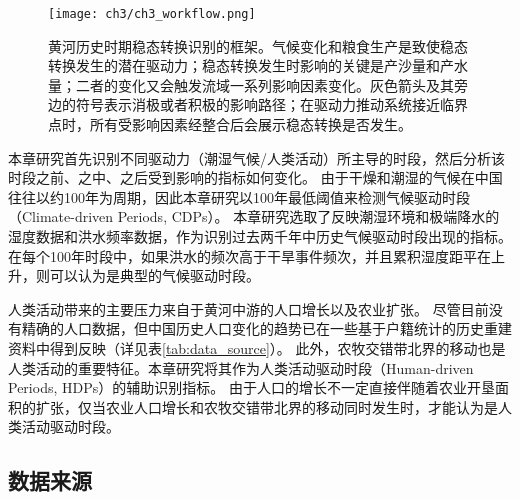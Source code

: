 \begin{figure}[htb] %
    \centering
    \texttt{[image: ch3/ch3\_workflow.png]}
    \caption[黄河历史时期水沙特征的稳态转换识别框架]{黄河历史时期稳态转换识别的框架。气候变化和粮食生产是致使稳态转换发生的潜在驱动力；稳态转换发生时影响的关键是产沙量和产水量；二者的变化又会触发流域一系列影响因素变化。灰色箭头及其旁边的符号表示消极或者积极的影响路径；在驱动力推动系统接近临界点时，所有受影响因素经整合后会展示稳态转换是否发生。}\label{fig:ch3:regime_shift_detect}
\end{figure}


本章研究首先识别不同驱动力（潮湿气候/人类活动）所主导的时段，然后分析该时段之前、之中、之后受到影响的指标如何变化。
由于干燥和潮湿的气候在中国往往以约100年为周期\cite{GeQuanSheng2011}，因此本章研究以100年最低阈值来检测气候驱动时段（Climate-driven Periods, CDPs）。
本章研究选取了反映潮湿环境和极端降水的湿度数据和洪水频率数据，作为识别过去两千年中历史气候驱动时段出现的指标。
在每个100年时段中，如果洪水的频次高于干旱事件频次，并且累积湿度距平在上升，则可以认为是典型的气候驱动时段。

人类活动带来的主要压力来自于黄河中游的人口增长以及农业扩张。
尽管目前没有精确的人口数据，但中国历史人口变化的趋势已在一些基于户籍统计的历史重建资料中得到反映（详见表\ref{tab:data_source}）。
此外，农牧交错带北界的移动也是人类活动的重要特征。本章研究将其作为人类活动驱动时段（Human-driven Periods, HDPs）的辅助识别指标。
由于人口的增长不一定直接伴随着农业开垦面积的扩张，仅当农业人口增长和农牧交错带北界的移动同时发生时，才能认为是人类活动驱动时段。

\subsection{数据来源}

